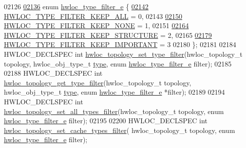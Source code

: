\begin{DoxyCode}
02126 
\hyperlink{a00193_ga9a5a1f0140cd1952544477833733195b}{02136} \textcolor{keyword}{enum} \hyperlink{a00193_ga9a5a1f0140cd1952544477833733195b}{hwloc\_type\_filter\_e} \{
\hyperlink{a00193_gga9a5a1f0140cd1952544477833733195bafda7b59e6810dfe778d8f9a4cc1e350e}{02142}   \hyperlink{a00193_gga9a5a1f0140cd1952544477833733195bafda7b59e6810dfe778d8f9a4cc1e350e}{HWLOC\_TYPE\_FILTER\_KEEP\_ALL} = 0,
02143 
\hyperlink{a00193_gga9a5a1f0140cd1952544477833733195ba4f835955414de92c77d99b8419d4647a}{02150}   \hyperlink{a00193_gga9a5a1f0140cd1952544477833733195ba4f835955414de92c77d99b8419d4647a}{HWLOC\_TYPE\_FILTER\_KEEP\_NONE} = 1,
02151 
\hyperlink{a00193_gga9a5a1f0140cd1952544477833733195ba7664716643bf1db83e631eed34f659e4}{02164}   \hyperlink{a00193_gga9a5a1f0140cd1952544477833733195ba7664716643bf1db83e631eed34f659e4}{HWLOC\_TYPE\_FILTER\_KEEP\_STRUCTURE} = 2,
02165 
\hyperlink{a00193_gga9a5a1f0140cd1952544477833733195ba63fd24954e18c83ff7eae9588759adb5}{02179}   \hyperlink{a00193_gga9a5a1f0140cd1952544477833733195ba63fd24954e18c83ff7eae9588759adb5}{HWLOC\_TYPE\_FILTER\_KEEP\_IMPORTANT} = 3
02180 \};
02181 
02184 HWLOC\_DECLSPEC \textcolor{keywordtype}{int} \hyperlink{a00193_gad894e70f15f8d4aada7be8d1aba38b7e}{hwloc\_topology\_set\_type\_filter}(hwloc\_topology\_t topology, 
      hwloc\_obj\_type\_t \hyperlink{a00238_acc4f0803f244867e68fe0036800be5de}{type}, \textcolor{keyword}{enum} \hyperlink{a00193_ga9a5a1f0140cd1952544477833733195b}{hwloc\_type\_filter\_e} filter);
02185 
02188 HWLOC\_DECLSPEC \textcolor{keywordtype}{int} \hyperlink{a00193_ga137ad1178f7a79f2383974d983083401}{hwloc\_topology\_get\_type\_filter}(hwloc\_topology\_t topology, 
      hwloc\_obj\_type\_t \hyperlink{a00238_acc4f0803f244867e68fe0036800be5de}{type}, \textcolor{keyword}{enum} \hyperlink{a00193_ga9a5a1f0140cd1952544477833733195b}{hwloc\_type\_filter\_e} *filter);
02189 
02194 HWLOC\_DECLSPEC \textcolor{keywordtype}{int} \hyperlink{a00193_ga9eb8dc3b106f84921bf5789101e97e24}{hwloc\_topology\_set\_all\_types\_filter}(hwloc\_topology\_t 
      topology, \textcolor{keyword}{enum} \hyperlink{a00193_ga9a5a1f0140cd1952544477833733195b}{hwloc\_type\_filter\_e} filter);
02195 
02200 HWLOC\_DECLSPEC \textcolor{keywordtype}{int} \hyperlink{a00193_ga30bd6d330fe3c8f0cbaad724d114ee20}{hwloc\_topology\_set\_cache\_types\_filter}(
      hwloc\_topology\_t topology, \textcolor{keyword}{enum} \hyperlink{a00193_ga9a5a1f0140cd1952544477833733195b}{hwloc\_type\_filter\_e} filter);

\end{DoxyCode}
